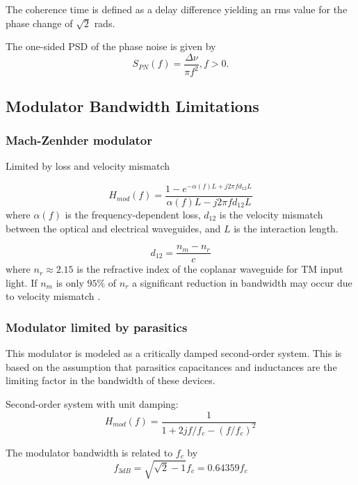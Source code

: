 \documentclass[a4paper]{article}
\begin{document}
The coherence time is defined as a delay difference yielding an rms value for the phase change of $\sqrt{2}$ rads.

The one-sided PSD of the phase noise is given by
\begin{equation}
	S_{PN}(f) = \frac{\Delta\nu}{\pi f^2}, f > 0.
\end{equation}

\subsection{Modulator Bandwidth Limitations}

\subsubsection{Mach-Zenhder modulator}
\cite{Barros2009, Ho2005}

Limited by loss and velocity mismatch

\begin{equation}
H_{mod}(f) = \frac{1-e^{-\alpha(f)L+j2\pi fd_{12}L}}{\alpha(f)L-j2\pi fd_{12}L}
\end{equation}
where $\alpha(f)$ is the frequency-dependent loss, $d_{12}$ is the velocity mismatch between the optical and electrical waveguides, and $L$ is the interaction length.

\begin{equation}
d_{12} = \frac{n_m-n_r}{c}
\end{equation}
where $n_r \approx 2.15$ is the refractive index of the coplanar waveguide for TM input light. If $n_m$ is only $95\%$ of $n_r$ a significant reduction in bandwidth may occur due to velocity mismatch \cite{Ho2005}.

\subsubsection{Modulator limited by parasitics}
This modulator is modeled as a critically damped second-order system. This is based on the assumption that parasitics capacitances and inductances are the limiting factor in the bandwidth of these devices.

Second-order system with unit damping:
\begin{equation}
H_{mod}(f) =  \frac{1}{1 + 2jf/f_c - (f/f_c)^2}
\end{equation}

The modulator bandwidth is related to $f_c$ by
\begin{equation}
f_{3dB} = \sqrt{\sqrt{2}-1}f_c = 0.64359f_c
\end{equation}
\end{document}
